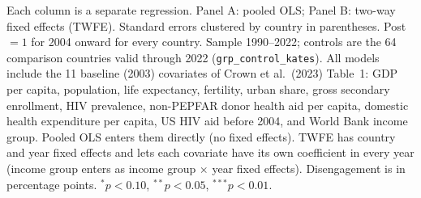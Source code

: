 \begin{table}[htbp]
\begin{minipage}{\textwidth}\footnotesize Each column is a separate regression. Panel A: pooled OLS; Panel B: two-way fixed effects (TWFE). Standard errors clustered by country in parentheses. Post $= 1$ for 2004 onward for every country. Sample 1990--2022; controls are the 64 comparison countries valid through 2022 (\texttt{grp\_control\_kates}). All models include the 11 baseline (2003) covariates of Crown et al.\ (2023) Table~1: GDP per capita, population, life expectancy, fertility, urban share, gross secondary enrollment, HIV prevalence, non-PEPFAR donor health aid per capita, domestic health expenditure per capita, US HIV aid before 2004, and World Bank income group. Pooled OLS enters them directly (no fixed effects). TWFE has country and year fixed effects and lets each covariate have its own coefficient in every year (income group enters as income group $\times$ year fixed effects). Disengagement is in percentage points. $^{*}p<0.10$, $^{**}p<0.05$, $^{***}p<0.01$.\end{minipage}
\end{table}
